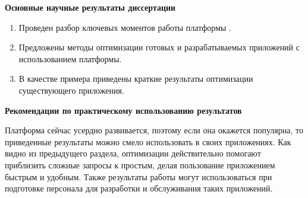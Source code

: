 
\textbf{Основные научные результаты диссертации}

\begin{enumerate}
  \item Проведен разбор ключевых моментов работы платформы \LB.
  \item Предложены методы оптимизации готовых и разрабатываемых приложений с использованием платформы.
  \item В качестве примера приведены краткие результаты оптимизации существующего приложения.
\end{enumerate}

\textbf{Рекомендации по практическому использованию результатов}

Платформа \LB сейчас усердно развивается, поэтому если она окажется популярна, то приведенные результаты можно смело использовать в своих приложениях. Как видно из предыдущего раздела, оптимизации действительно помогают приблизить сложные запросы к простым, делая пользование приложением быстрым и удобным. Также результаты работы могут использоваться при подготовке персонала для разработки и обслуживания таких приложений.
